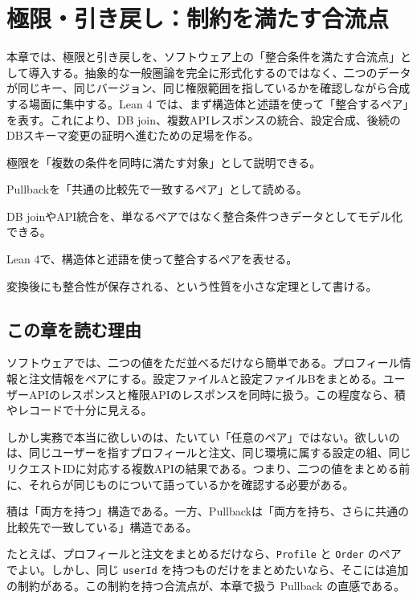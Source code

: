 \chapter{極限・引き戻し：制約を満たす合流点}
\label{chap:limits-pullbacks}

\begin{chapterabstract}
本章では、極限と引き戻しを、ソフトウェア上の「整合条件を満たす合流点」として導入する。抽象的な一般圏論を完全に形式化するのではなく、二つのデータが同じキー、同じバージョン、同じ権限範囲を指しているかを確認しながら合成する場面に集中する。Lean 4 では、まず構造体と述語を使って「整合するペア」を表す。これにより、DB join、複数APIレスポンスの統合、設定合成、後続のDBスキーマ変更の証明へ進むための足場を作る。
\end{chapterabstract}

\begin{learninggoals}
\item 極限を「複数の条件を同時に満たす対象」として説明できる。
\item Pullbackを「共通の比較先で一致するペア」として読める。
\item DB joinやAPI統合を、単なるペアではなく整合条件つきデータとしてモデル化できる。
\item Lean 4で、構造体と述語を使って整合するペアを表せる。
\item 変換後にも整合性が保存される、という性質を小さな定理として書ける。
\end{learninggoals}

\section{この章を読む理由}

ソフトウェアでは、二つの値をただ並べるだけなら簡単である。プロフィール情報と注文情報をペアにする。設定ファイルAと設定ファイルBをまとめる。ユーザーAPIのレスポンスと権限APIのレスポンスを同時に扱う。この程度なら、積やレコードで十分に見える。

しかし実務で本当に欲しいのは、たいてい「任意のペア」ではない。欲しいのは、同じユーザーを指すプロフィールと注文、同じ環境に属する設定の組、同じリクエストIDに対応する複数APIの結果である。つまり、二つの値をまとめる前に、それらが同じものについて語っているかを確認する必要がある。

\begin{intuitionbox}
積は「両方を持つ」構造である。一方、Pullbackは「両方を持ち、さらに共通の比較先で一致している」構造である。

たとえば、プロフィールと注文をまとめるだけなら、\texttt{Profile} と \texttt{Order} のペアでよい。しかし、同じ \texttt{userId} を持つものだけをまとめたいなら、そこには追加の制約がある。この制約を持つ合流点が、本章で扱う Pullback の直感である。
\end{intuitionbox}

